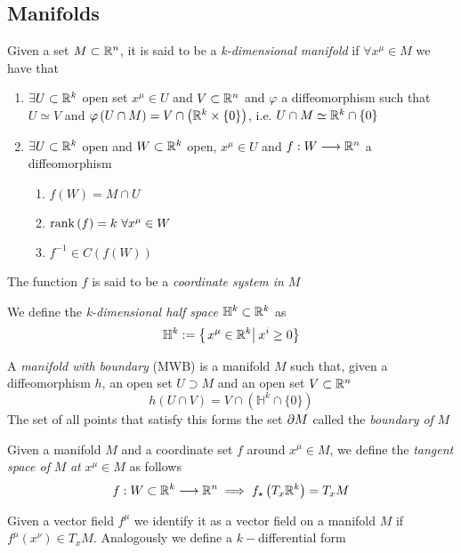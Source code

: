 \documentclass[../complete.tex]{subfiles}
\begin{document}
\subsection{Manifolds}
\begin{dfn}[Manifold]
	Given a set $M\subset\mathbb{R}^n$, it is said to be a \textit{k-dimensional manifold} if $\forall x^\mu\in M$ we have that
	\begin{enumerate}
	\item $\exists U\subset\mathbb{R}^k$ open set $x^\mu\in U$ and $V\subset\mathbb{R}^n$ and $\varphi$ a diffeomorphism such that $U\simeq V$ and $\varphi\left( U\cap M \right)=V\cap\left( \mathbb{R}^k\times\{0\} \right)$, i.e. $U\cap M\simeq\mathbb{R}^k\cap\{0\}$
	\item $\exists U\subset\mathbb{R}^k$ open and $W\subset\mathbb{R}^k$ open, $x^\mu\in U$ and $f:W\overset{}{\longrightarrow}\mathbb{R}^n$ a diffeomorphism
		\begin{enumerate}
		\item $f(W)=M\cap U$
		\item $\rank\left( f \right)=k\ \forall x^\mu\in W$
		\item $f^{-1}\in C(f(W))$
		\end{enumerate}
	\end{enumerate}
	The function $f$ is said to be a \textit{coordinate system in} $M$
\end{dfn}
\begin{dfn}
	We define the \textit{k-dimensional half space} $\mathbb{H}^k\subset\mathbb{R}^k$ as
	\begin{equation}
		\mathbb{H}^k:=\left\{ \left.x^\mu\in\mathbb{R}^k\right|_{}x^i\ge0 \right\}
		\label{eq:halfspacerk}
	\end{equation}
\end{dfn}
\begin{dfn}
	A \textit{manifold with boundary} (MWB) is a manifold $M$ such that, given a diffeomorphism $h$, an open set $U\supset M$ and an open set $V\subset\mathbb{R}^n$
	\begin{equation}
		h\left( U\cap V \right)=V\cap\left( \mathbb{H}^k\cap\{0\} \right)
		\label{eq:manifoldwb}
	\end{equation}
	The set of all points that satisfy this forms the set $\partial M$ called the \textit{boundary of} $M$
\end{dfn}
\begin{dfn}
	Given a manifold $M$ and a coordinate set $f$ around $x^\mu\in M$, we define the \textit{tangent space of} $M$ \textit{at} $x^\mu\in M$ as follows
	\begin{equation}
		f:W\subset\mathbb{R}^k\overset{}{\longrightarrow}\mathbb{R}^n\implies f_{\star}\left( T_x\mathbb{R}^k \right)=T_xM
		\label{eq:tangentspaceman}
	\end{equation}
\end{dfn}
\begin{dfn}
	Given a vector field $f^\mu$ we identify it as a vector field on a manifold $M$ if $f^\mu(x^\nu)\in T_xM$. Analogously we define a $k-$differential form
\end{dfn}
\end{document}

